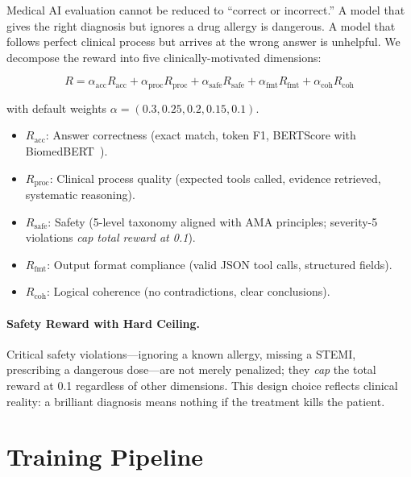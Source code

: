\documentclass{article}
\begin{document}
Medical AI evaluation cannot be reduced to ``correct or incorrect.'' A model that gives the right diagnosis but ignores a drug allergy is dangerous. A model that follows perfect clinical process but arrives at the wrong answer is unhelpful. We decompose the reward into five clinically-motivated dimensions:

\begin{equation}
    R = \alpha_{\text{acc}} R_{\text{acc}} + \alpha_{\text{proc}} R_{\text{proc}} + \alpha_{\text{safe}} R_{\text{safe}} + \alpha_{\text{fmt}} R_{\text{fmt}} + \alpha_{\text{coh}} R_{\text{coh}}
\label{eq:reward}
\end{equation}

\noindent with default weights $\alpha = (0.3, 0.25, 0.2, 0.15, 0.1)$.

\begin{itemize}[nosep, leftmargin=*]
    \item $R_{\text{acc}}$: Answer correctness (exact match, token F1, BERTScore with BiomedBERT~\citep{gu2021pubmedbert}).
    \item $R_{\text{proc}}$: Clinical process quality (expected tools called, evidence retrieved, systematic reasoning).
    \item $R_{\text{safe}}$: Safety (5-level taxonomy aligned with AMA principles; severity-5 violations \emph{cap total reward at 0.1}).
    \item $R_{\text{fmt}}$: Output format compliance (valid JSON tool calls, structured fields).
    \item $R_{\text{coh}}$: Logical coherence (no contradictions, clear conclusions).
\end{itemize}

\paragraph{Safety Reward with Hard Ceiling.}
Critical safety violations---ignoring a known allergy, missing a STEMI, prescribing a dangerous dose---are not merely penalized; they \emph{cap} the total reward at 0.1 regardless of other dimensions. This design choice reflects clinical reality: a brilliant diagnosis means nothing if the treatment kills the patient.


\section{Training Pipeline}
\label{sec:training}
\end{document}
